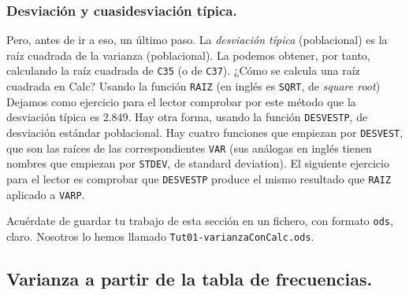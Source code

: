 \documentclass[10pt,a4paper]{article}\usepackage[]{graphicx}\usepackage[]{color}
\begin{document}
\subsubsection*{Desviación y cuasidesviación típica.}
\label{tut01:subsubsec:DesviacionCuasidesviacion}

Pero, antes de ir a eso, un último paso. La {\em desviación típica} (poblacional) es la raíz cuadrada de la varianza (poblacional). La podemos obtener, por tanto, calculando la raíz cuadrada de {\tt C35} (o de {\tt C37}). ¿Cómo se calcula una raíz cuadrada en Calc? Usando la función {\tt RAIZ} (en inglés es {\tt SQRT}, de {\em square root}) Dejamos como ejercicio para el lector comprobar por este método que la desviación típica es 2.849. Hay otra forma, usando la función {\tt DESVESTP}, de desviación estándar poblacional. Hay cuatro funciones que empiezan por {\tt DESVEST}, que son las raíces de las correspondientes {\tt VAR} (sus análogas en inglés tienen nombres que empiezan por {\tt STDEV}, de standard deviation). El siguiente ejercicio para el lector es comprobar que {\tt DESVESTP} produce el mismo resultado que {\tt RAIZ} aplicado a {\tt VARP}.

Acuérdate de guardar tu trabajo de esta sección en un fichero, con formato {\tt ods}, claro. Nosotros lo hemos llamado {\tt Tut01-varianzaConCalc.ods}.

\subsection{Varianza a partir de la tabla de frecuencias.}
\label{tut02:sec:VarianzaTablaFrecuencias}
\end{document}
